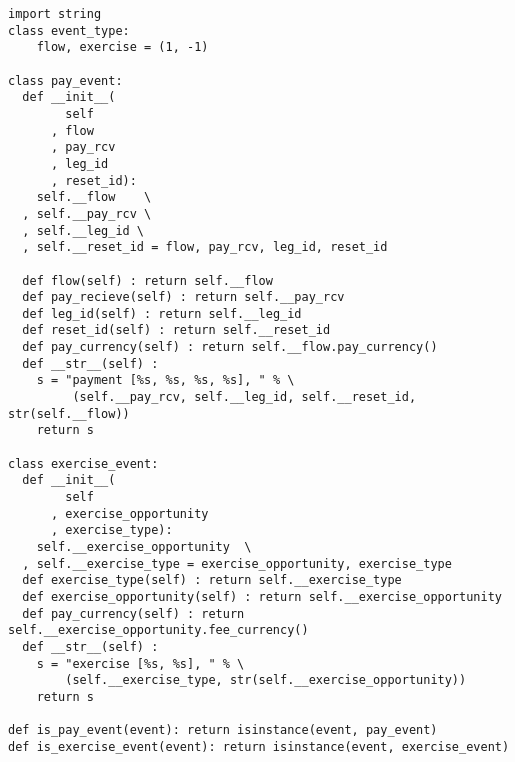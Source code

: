 \begin{verbatim}
import string
class event_type:
    flow, exercise = (1, -1)

class pay_event:
  def __init__(
        self
      , flow
      , pay_rcv
      , leg_id
      , reset_id):
    self.__flow    \
  , self.__pay_rcv \
  , self.__leg_id \
  , self.__reset_id = flow, pay_rcv, leg_id, reset_id

  def flow(self) : return self.__flow
  def pay_recieve(self) : return self.__pay_rcv
  def leg_id(self) : return self.__leg_id
  def reset_id(self) : return self.__reset_id
  def pay_currency(self) : return self.__flow.pay_currency()
  def __str__(self) :
    s = "payment [%s, %s, %s, %s], " % \
         (self.__pay_rcv, self.__leg_id, self.__reset_id, str(self.__flow))
    return s

class exercise_event:
  def __init__(
        self
      , exercise_opportunity
      , exercise_type):
    self.__exercise_opportunity  \
  , self.__exercise_type = exercise_opportunity, exercise_type
  def exercise_type(self) : return self.__exercise_type
  def exercise_opportunity(self) : return self.__exercise_opportunity
  def pay_currency(self) : return self.__exercise_opportunity.fee_currency()
  def __str__(self) :
    s = "exercise [%s, %s], " % \
        (self.__exercise_type, str(self.__exercise_opportunity))
    return s

def is_pay_event(event): return isinstance(event, pay_event)
def is_exercise_event(event): return isinstance(event, exercise_event)
\end{verbatim}

